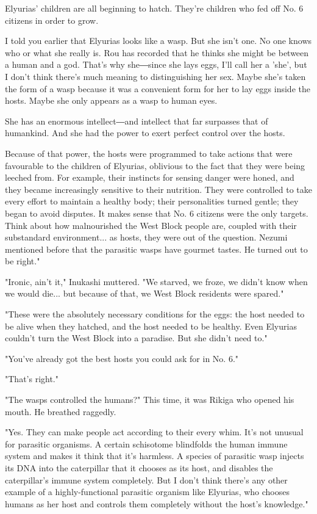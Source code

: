 Elyurias' children are all beginning to hatch. They're children who fed
off No. 6 citizens in order to grow.

I told you earlier that Elyurias looks like a wasp. But she isn't one.
No one knows who or what she really is. Rou has recorded that he thinks
she might be between a human and a god. That's why she―since she lays
eggs, I'll call her a 'she', but I don't think there's much meaning to
distinguishing her sex. Maybe she's taken the form of a wasp because it
was a convenient form for her to lay eggs inside the hosts. Maybe she
only appears as a wasp to human eyes.

She has an enormous intellect―and intellect that far surpasses that of
humankind. And she had the power to exert perfect control over the
hosts.

Because of that power, the hosts were programmed to take actions that
were favourable to the children of Elyurias, oblivious to the fact that
they were being leeched from. For example, their instincts for sensing
danger were honed, and they became increasingly sensitive to their
nutrition. They were controlled to take every effort to maintain a
healthy body; their personalities turned gentle; they began to avoid
disputes. It makes sense that No. 6 citizens were the only targets.
Think about how malnourished the West Block people are, coupled with
their substandard environment... as hosts, they were out of the
question. Nezumi mentioned before that the parasitic wasps have gourmet
tastes. He turned out to be right."

"Ironic, ain't it," Inukashi muttered. "We starved, we froze, we didn't
know when we would die... but because of that, we West Block residents
were spared."

"These were the absolutely necessary conditions for the eggs: the host
needed to be alive when they hatched, and the host needed to be healthy.
Even Elyurias couldn't turn the West Block into a paradise. But she
didn't need to."

"You've already got the best hosts you could ask for in No. 6."

"That's right."

"The wasps controlled the humans?" This time, it was Rikiga who opened
his mouth. He breathed raggedly.

"Yes. They can make people act according to their every whim. It's not
unusual for parasitic organisms. A certain schisotome blindfolds the
human immune system and makes it think that it's harmless. A species of
parasitic wasp injects its DNA into the caterpillar that it chooses as
its host, and disables the caterpillar's immune system completely. But I
don't think there's any other example of a highly-functional parasitic
organism like Elyurias, who chooses humans as her host and controls them
completely without the host's knowledge."

